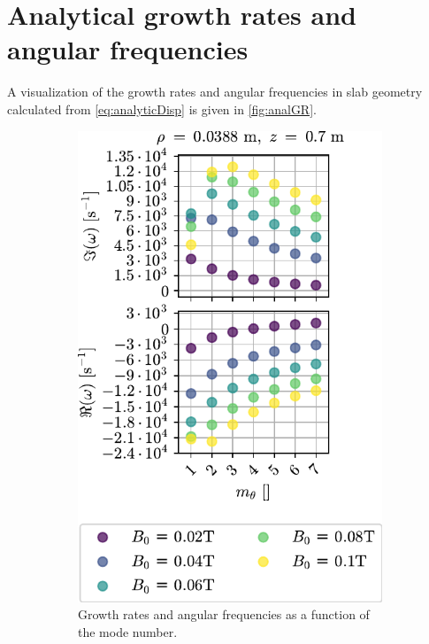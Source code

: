 \section{Analytical growth rates and angular frequencies}
\label{sec:analDisp}
%
A visualization of the growth rates and angular frequencies in slab geometry calculated from \cref{eq:analyticDisp} is given in \cref{fig:analGR}.
%
\begin{figure}[htbp]
    \centering
    \begin{subfigure}[h]{0.45\textwidth}
       \centering
       \includegraphics{fig/results/growthRates/growthRatesAnalyticB0ModeNr}
       \caption{Growth rates and angular frequencies as a function of the mode number.}
       \label{fig:grAnalytic}
    \end{subfigure}
    \hfill
    \begin{subfigure}[h]{0.45\textwidth}

\end{subfigure}
\end{figure}
